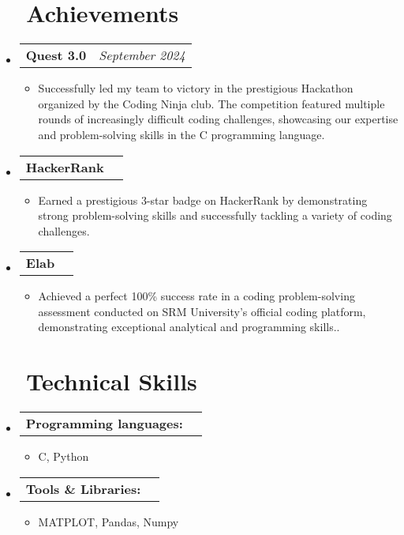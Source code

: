 \documentclass[a4paper,20pt]{article}
\makeatletter
\newcommand{\resumeItemWithoutTitle}[1]{
    \item\small{
            {\vspace{-2pt}}
    }
}
\newcommand{\resumeSubheadingSingleRow}[2]{
    \vspace{-1pt}\item
    \begin{tabular*}{0.97\textwidth}{l@{\extracolsep{\fill}}r}
        \textbf{#1} & \textit{#2}          \\
    \end{tabular*}\vspace{-5pt}
}
\newcommand{\resumeSubHeadingListStart}{\begin{itemize}[leftmargin=*]}
\newcommand{\resumeSubHeadingListEnd}{\end{itemize}}
\newcommand{\resumeItemListStart}{\begin{itemize}}
\newcommand{\resumeItemListEnd}{\end{itemize}\vspace{-5pt}}
\makeatother
\begin{document}
\section{~~Achievements}
\vspace{5pt}
\resumeSubHeadingListStart
\resumeSubheadingSingleRow{Quest 3.0}{September 2024}
\resumeItemListStart
\resumeItemWithoutTitle{}{Successfully led my team to victory in the prestigious Hackathon organized by the Coding Ninja club. The competition featured multiple rounds of increasingly difficult coding challenges, showcasing our expertise and problem-solving skills in the C programming language.}
\resumeItemListEnd
\resumeSubHeadingListEnd
\vspace{-5pt}
\resumeSubHeadingListStart
\resumeSubheadingSingleRow{HackerRank}{}
\resumeItemListStart
\resumeItemWithoutTitle{}{
Earned a prestigious 3-star badge on HackerRank by demonstrating strong problem-solving skills and successfully tackling a variety of coding challenges.}
\resumeItemListEnd
\resumeSubHeadingListEnd
\vspace{-5pt}
\resumeSubHeadingListStart
\resumeSubheadingSingleRow{Elab}{}
\resumeItemListStart
\resumeItemWithoutTitle{}{Achieved a perfect 100\% success rate in a coding problem-solving assessment conducted on SRM University's official coding platform, demonstrating exceptional analytical and programming skills..}
\resumeItemListEnd
\resumeSubHeadingListEnd
\vspace{-5pt}
\section{~~Technical Skills}
\vspace{5pt}
\resumeSubHeadingListStart
\resumeSubheadingSingleRow{Programming languages:}{}
\resumeItemListStart
\resumeItemWithoutTitle{}{C, Python}
\resumeItemListEnd
\resumeSubHeadingListEnd
\vspace{-5pt}
\resumeSubHeadingListStart
\resumeSubheadingSingleRow{Tools \& Libraries:}{}
\resumeItemListStart
\resumeItemWithoutTitle{}{MATPLOT, Pandas, Numpy}
\resumeItemListEnd
\resumeSubHeadingListEnd

\end{document}
